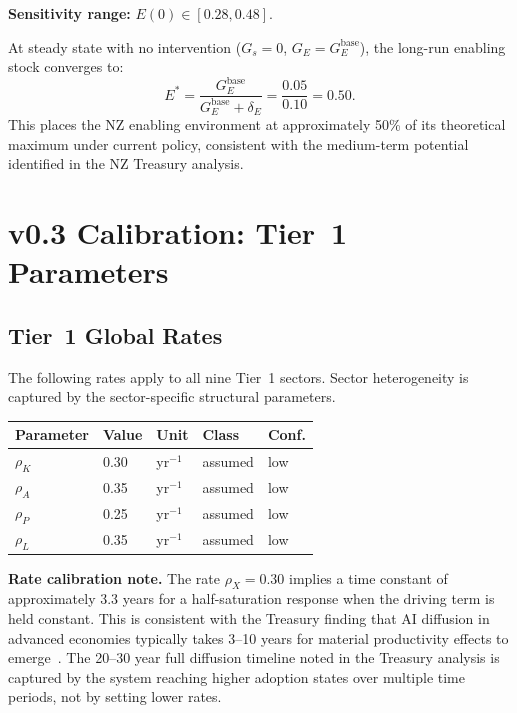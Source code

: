 \documentclass[11pt,a4paper]{article}
\begin{document}
\textbf{Sensitivity range:} $E(0) \in [0.28, 0.48]$.

At steady state with no intervention ($G_s = 0$, $G_E = G_E^{\text{base}}$), the long-run enabling stock converges to:
\[
E^* = \frac{G_E^{\text{base}}}{G_E^{\text{base}} + \delta_E} = \frac{0.05}{0.10} = 0.50.
\]
This places the NZ enabling environment at approximately 50\% of its theoretical maximum under current policy, consistent with the medium-term potential identified in the NZ Treasury analysis.

\section{v0.3 Calibration: Tier~1 Parameters}
\label{sec:cal_t1}

\subsection{Tier~1 Global Rates}

The following rates apply to all nine Tier~1 sectors. Sector heterogeneity is captured by the sector-specific structural parameters.

\begin{center}
\begin{tabular}{lllll}
\toprule
Parameter & Value & Unit & Class & Conf. \\
\midrule
$\rho_K$ & 0.30 & yr$^{-1}$ & assumed & low \\
$\rho_A$ & 0.35 & yr$^{-1}$ & assumed & low \\
$\rho_P$ & 0.25 & yr$^{-1}$ & assumed & low \\
$\rho_L$ & 0.35 & yr$^{-1}$ & assumed & low \\
\bottomrule
\end{tabular}
\end{center}

\textbf{Rate calibration note.} The rate $\rho_X = 0.30$ implies a time constant of approximately 3.3 years for a half-saturation response when the driving term is held constant. This is consistent with the Treasury finding that AI diffusion in advanced economies typically takes 3--10 years for material productivity effects to emerge~\cite{nztreasury2024}. The 20--30 year full diffusion timeline noted in the Treasury analysis is captured by the system reaching higher adoption states over multiple time periods, not by setting lower rates.
\end{document}
